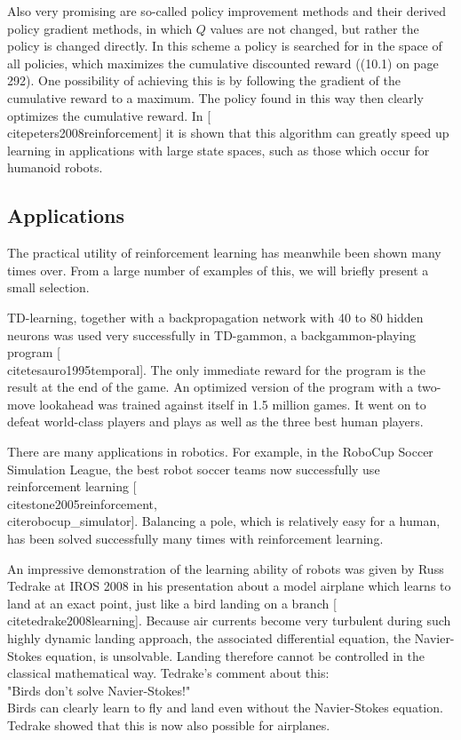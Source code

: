 \documentclass[10pt]{book}
\begin{document}
Also very promising are so-called policy improvement methods and their derived policy gradient methods, in which $Q$ values are not changed, but rather the policy is changed directly. In this scheme a policy is searched for in the space of all policies, which maximizes the cumulative discounted reward ((10.1) on page 292). One possibility of achieving this is by following the gradient of the cumulative reward to a maximum. The policy found in this way then clearly optimizes the cumulative reward. In [\\cite{peters2008reinforcement}] it is shown that this algorithm can greatly speed up learning in applications with large state spaces, such as those which occur for humanoid robots.

\subsection*{Applications}
The practical utility of reinforcement learning has meanwhile been shown many times over. From a large number of examples of this, we will briefly present a small selection.

TD-learning, together with a backpropagation network with 40 to 80 hidden neurons was used very successfully in TD-gammon, a backgammon-playing program [\\cite{tesauro1995temporal}]. The only immediate reward for the program is the result at the end of the game. An optimized version of the program with a two-move lookahead was trained against itself in 1.5 million games. It went on to defeat world-class players and plays as well as the three best human players.

There are many applications in robotics. For example, in the RoboCup Soccer Simulation League, the best robot soccer teams now successfully use reinforcement learning [\\cite{stone2005reinforcement}, \\cite{robocup_simulator}]. Balancing a pole, which is relatively easy for a human, has been solved successfully many times with reinforcement learning.

An impressive demonstration of the learning ability of robots was given by Russ Tedrake at IROS 2008 in his presentation about a model airplane which learns to land at an exact point, just like a bird landing on a branch [\\cite{tedrake2008learning}]. Because air currents become very turbulent during such highly dynamic landing approach, the associated differential equation, the Navier-Stokes equation, is unsolvable. Landing therefore cannot be controlled in the classical mathematical way. Tedrake's comment about this:\\
"Birds don't solve Navier-Stokes!"\\
Birds can clearly learn to fly and land even without the Navier-Stokes equation. Tedrake showed that this is now also possible for airplanes.
\end{document}
